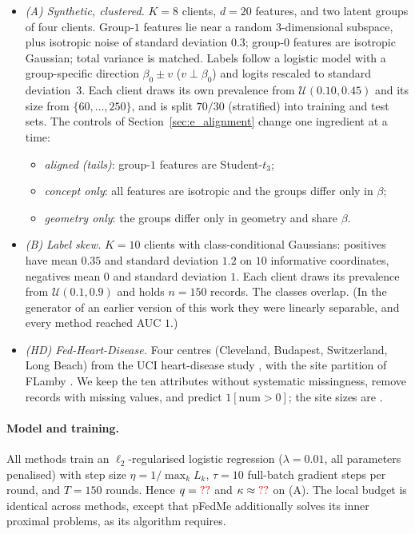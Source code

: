 \begin{itemize}[leftmargin=1.2em,itemsep=2pt]
  \item \emph{(A) Synthetic, clustered.} $K=8$ clients, $d=20$ features, and two latent
    groups of four clients. Group-$1$ features lie near a random $3$-dimensional subspace,
    plus isotropic noise of standard deviation $0.3$; group-$0$ features are isotropic
    Gaussian; total variance is matched. Labels follow a logistic model with a
    group-specific direction $\beta_0\pm v$ ($v\perp\beta_0$) and logits rescaled to
    standard deviation~$3$. Each client draws its own prevalence from $\mathcal U(0.10,0.45)$
    and its size from $\{60,\dots,250\}$, and is split $70/30$ (stratified) into training
    and test sets. The controls of Section~\ref{sec:e_alignment} change one ingredient at a
    time:
    \begin{itemize}[leftmargin=1.2em,itemsep=1pt]
      \item \emph{aligned (tails)}: group-$1$ features are Student-$t_3$;
      \item \emph{concept only}: all features are isotropic and the groups differ only in
        $\beta$;
      \item \emph{geometry only}: the groups differ only in geometry and share $\beta$.
    \end{itemize}
  \item \emph{(B) Label skew.} $K=10$ clients with class-conditional Gaussians: positives
    have mean $0.35$ and standard deviation $1.2$ on $10$ informative coordinates, negatives
    mean $0$ and standard deviation $1$. Each client draws its prevalence from
    $\mathcal U(0.1,0.9)$ and holds $n=150$ records. The classes overlap. (In the generator
    of an earlier version of this work they were linearly separable, and every method
    reached AUC $1$.)
  \item \emph{(HD) Fed-Heart-Disease.} Four centres (Cleveland, Budapest, Switzerland, Long
    Beach) from the UCI heart-disease study \citep{detrano1989international}, with the site
    partition of FLamby \citep{terrail2022flamby}. We keep the ten attributes without
    systematic missingness, remove records with missing values, and predict $1[\mathrm{num}>0]$;
    the site sizes are \HDsizes.
\end{itemize}

\paragraph{Model and training.}
All methods train an $\ell_2$-regularised logistic regression ($\lambda=0.01$, all
parameters penalised) with step size $\eta=1/\max_kL_k$, $\tau=10$ full-batch gradient steps
per round, and $T=150$ rounds. Hence $q=\textcolor{red}{??}$ and $\kappa\approx\textcolor{red}{??}$ on (A). The
local budget is identical across methods, except that pFedMe additionally solves its inner
proximal problems, as its algorithm requires.

